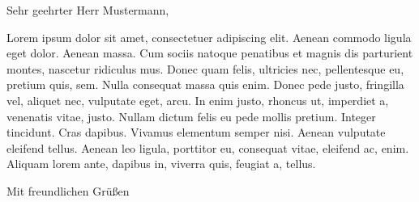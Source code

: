 \documentclass[basic]{../onlinebrief24}
\begin{document}
\begin{letter}{}

\opening{Sehr geehrter Herr Mustermann,}

Lorem ipsum dolor sit amet, consectetuer adipiscing elit. Aenean commodo ligula eget dolor. Aenean massa. Cum sociis natoque penatibus et magnis dis parturient montes, nascetur ridiculus mus. Donec quam felis, ultricies nec, pellentesque eu, pretium quis, sem. Nulla consequat massa quis enim. Donec pede justo, fringilla vel, aliquet nec, vulputate eget, arcu. In enim justo, rhoncus ut, imperdiet a, venenatis vitae, justo. Nullam dictum felis eu pede mollis pretium. Integer tincidunt. Cras dapibus. Vivamus elementum semper nisi. Aenean vulputate eleifend tellus. Aenean leo ligula, porttitor eu, consequat vitae, eleifend ac, enim. Aliquam lorem ante, dapibus in, viverra quis, feugiat a, tellus.

\closing{Mit freundlichen Grüßen}

\end{letter}
\end{document}
